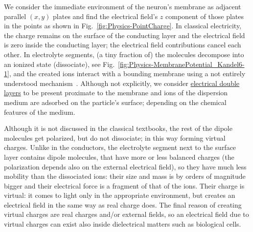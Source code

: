 We consider the immediate environment of the neuron's membrane
as adjacent parallel $(x,y)$ plates and find the electrical field's $z$ component of those plates in the points
as shown in Fig.~\ref{fig:Physics-PointCharge}.
%
In classical electricity, the charge remains on the surface of the conducting layer and the electrical field is zero inside the conducting layer; the electrical 
field contributions cancel each other.
In electrolyte segments, (a tiny fraction of) the molecules decompose into an ionized state (dissociate), see Fig.~\ref{fig:Physics-MembranePotential_Kandel6-1}, and the created ions interact with a bounding
membrane using a not entirely understood mechanism~\cite{MembraneBindingDipole:2025}.  Although not explicitly, we consider \href{https://www.sciencedirect.com/topics/engineering/electric-double-layer}{electrical double layers} to be present proximate to the membrane and ions of the dispersion medium are adsorbed on the particle's surface; depending on the chemical features of the medium.

%
%
%	
%


Although it is not discussed in the classical textbooks, the rest of the dipole molecules get polarized, but do not dissociate; in this way forming virtual charges. Unlike in the conductors, the electrolyte segment next to the surface layer contains dipole molecules,
that have more or less balanced charges (the polarization depends also on the external electrical field), so they have much less mobility than the dissociated ions: their size and mass is by orders of magnitude bigger and their electrical force is a fragment of that of the ions. Their charge is virtual: it comes to light only in the appropriate environment, but creates an electrical field in the same way as real charge does. The final reason of creating virtual charges are real charges and/or external fields, so an electrical field due to virtual charges can exist also 
inside dielectrical matters such as biological cells.



